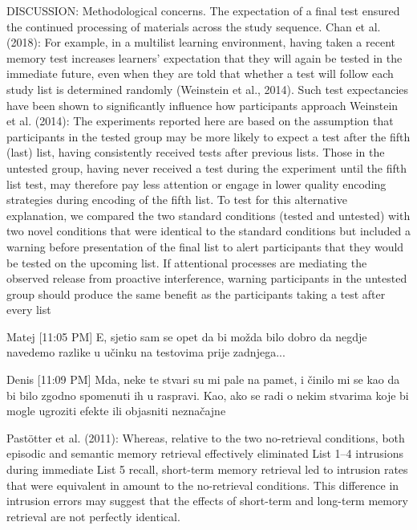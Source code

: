 \documentclass[../main.tex]{subfiles}
\begin{document}
DISCUSSION:
Methodological concerns. The expectation of a final test ensured the
continued processing of materials across the study sequence.
Chan et al. (2018): %
For example, in a multilist learning environment, having taken a
recent memory test increases learners’ expectation that they will
again be tested in the immediate future, even when they are told
that whether a test will follow each study list is determined
randomly (Weinstein et al., 2014). Such test expectancies have
been shown to significantly influence how participants approach
Weinstein et al. (2014):
The experiments reported here are based on the assumption that
participants in the tested group may be more likely to expect a test
after the fifth (last) list, having consistently received tests after
previous lists. Those in the untested group, having never received
a test during the experiment until the fifth list test, may therefore
pay less attention or engage in lower quality encoding strategies
during encoding of the fifth list. To test for this alternative explanation, 
we compared the two standard conditions (tested and
untested) with two novel conditions that were identical to the
standard conditions but included a warning before presentation of
the final list to alert participants that they would be tested on the
upcoming list. If attentional processes are mediating the observed
release from proactive interference, warning participants in the
untested group should produce the same benefit as the participants
taking a test after every list


Matej [11:05 PM]
E, sjetio sam se opet da bi možda bilo dobro da negdje navedemo razlike u učinku na testovima prije zadnjega...

Denis [11:09 PM]
Mda, neke te stvari su mi pale na pamet, i činilo mi se kao da bi bilo zgodno spomenuti ih u raspravi. Kao, ako se radi o nekim stvarima koje bi mogle ugroziti efekte ili objasniti neznačajne



Pastötter et al. (2011):
Whereas, relative to the two no-retrieval conditions,
both episodic and semantic memory retrieval effectively
eliminated List 1–4 intrusions during immediate List 5 recall,
short-term memory retrieval led to intrusion rates that were equivalent
in amount to the no-retrieval conditions. This difference in
intrusion errors may suggest that the effects of short-term and
long-term memory retrieval are not perfectly identical.
\end{document}
